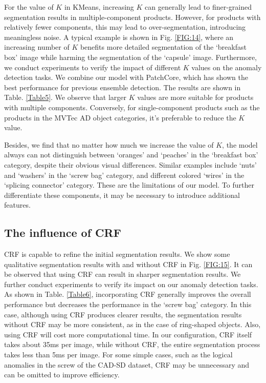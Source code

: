 \documentclass[final,5p,times,twocolumn]{elsarticle}
\begin{document}
For the value of $K$ in KMeans, increasing $K$ can generally lead to finer-grained segmentation results in multiple-component products. However, for products with relatively fewer components, this may lead to over-segmentation, introducing meaningless noise. A typical example is shown in Fig. \ref{FIG:14}, where an increasing number of $K$ benefits more detailed segmentation of the `breakfast box' image while harming the segmentation of the `capsule' image. Furthermore, we conduct experiments to verify the impact of different $K$ values on the anomaly detection tasks. We combine our model with PatchCore, which has shown the best performance for previous ensemble detection. The results are shown in Table. \ref{Table5}. We observe that larger $K$ values are more suitable for products with multiple components. Conversely, for single-component products such as the products in the MVTec AD object categories, it's preferable to reduce the $K$ value.  

Besides, we find that no matter how much we increase the value of $K$, the model always can not distinguish between `oranges' and `peaches' in the `breakfast box' category, despite their obvious visual differences. Similar examples include `nuts' and `washers' in the `screw bag' category, and different colored `wires' in the `splicing connector' category. These are the limitations of our model. To further differentiate these components, it may be necessary to introduce additional features.  

\subsection{The influence of CRF}
\label{5.3}
CRF is capable to refine the initial segmentation results. We show some qualitative segmentation results with and without CRF in Fig. \ref{FIG:15}. It can be observed that using CRF can result in sharper segmentation results. We further conduct experiments to verify its impact on our anomaly detection tasks. As shown in Table. \ref{Table6}, incorporating CRF generally improves the overall performance but decreases the performance in the `screw bag' category. In this case, although using CRF produces clearer results, the segmentation results without CRF may be more consistent, as in the case of ring-shaped objects. Also, using CRF will cost more computational time. In our configuration, CRF itself takes about 35ms per image, while without CRF, the entire segmentation process takes less than 5ms per image. For some simple cases, such as the logical anomalies in the screw of the CAD-SD dataset, CRF may be unnecessary and can be omitted to improve efficiency.
\end{document}
